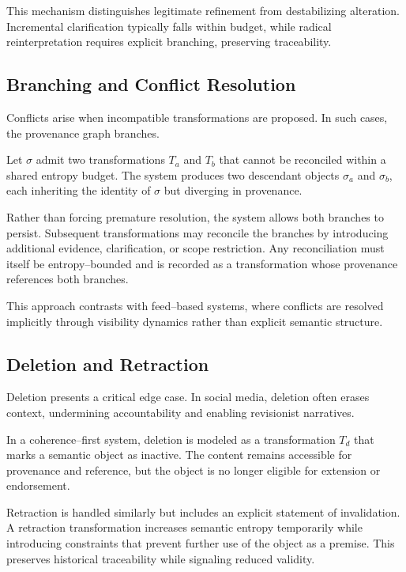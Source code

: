 \documentclass[11pt]{article}
\begin{document}
This mechanism distinguishes legitimate refinement from destabilizing alteration.
Incremental clarification typically falls within budget, while radical reinterpretation
requires explicit branching, preserving traceability.

\subsection{Branching and Conflict Resolution}

Conflicts arise when incompatible transformations are proposed. In such cases, the
provenance graph branches.

Let $\sigma$ admit two transformations $T_a$ and $T_b$ that cannot be reconciled within a
shared entropy budget. The system produces two descendant objects $\sigma_a$ and
$\sigma_b$, each inheriting the identity of $\sigma$ but diverging in provenance.

Rather than forcing premature resolution, the system allows both branches to persist.
Subsequent transformations may reconcile the branches by introducing additional evidence,
clarification, or scope restriction. Any reconciliation must itself be entropy--bounded
and is recorded as a transformation whose provenance references both branches.

This approach contrasts with feed--based systems, where conflicts are resolved implicitly
through visibility dynamics rather than explicit semantic structure.

\subsection{Deletion and Retraction}

Deletion presents a critical edge case. In social media, deletion often erases context,
undermining accountability and enabling revisionist narratives.

In a coherence--first system, deletion is modeled as a transformation $T_d$ that marks a
semantic object as inactive. The content remains accessible for provenance and reference,
but the object is no longer eligible for extension or endorsement.

Retraction is handled similarly but includes an explicit statement of invalidation. A
retraction transformation increases semantic entropy temporarily while introducing
constraints that prevent further use of the object as a premise. This preserves historical
traceability while signaling reduced validity.
\end{document}
